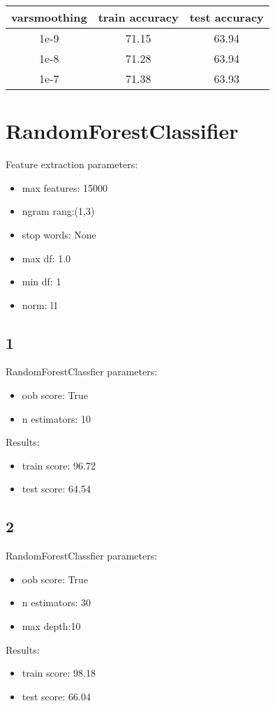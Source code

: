 \documentclass[a4paper,10pt]{article}
\begin{document}
\begin{table}[h]
\centering
\begin{tabular}{|c|c|c|}
\hline
varsmoothing&train accuracy&test accuracy\\
\hline
1e-9&71.15&63.94\\
\hline
1e-8&71.28&63.94\\
\hline
1e-7&71.38&63.93\\
\hline

\end{tabular}

\end{table}




\section{RandomForestClassifier}
\par Feature extraction parameters:
\begin{itemize}
\item max features: 15000
\item ngram rang:(1,3)
\item stop words: None
\item max df: 1.0
\item min df: 1
\item norm: l1
\end{itemize}
\subsection{1}
\par RandomForestClassfier parameters:
\begin{itemize}
\item oob score: True
\item n estimators: 10
\end{itemize}
\par Results:
\begin{itemize}
\item train score: 96.72
\item test score: 64.54
\end{itemize}

\subsection{2}
\par RandomForestClassfier parameters:
\begin{itemize}
\item oob score: True
\item n estimators: 30
\item max depth:10
\end{itemize}
\par Results:
\begin{itemize}
\item train score: 98.18
\item test score: 66.04
\end{itemize}
\end{document}
